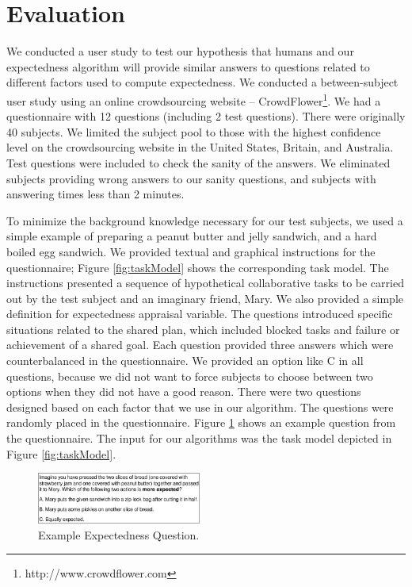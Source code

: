 \documentclass{aamas2016_extendedabstract}
\begin{document}
\vspace*{-3mm}
\section{Evaluation}

We conducted a user study to test our hypothesis that humans and our
expectedness algorithm will provide similar answers to questions related to
different factors used to compute expectedness. We conducted a between-subject
user study using an online crowdsourcing website --
CrowdFlower\footnote{http://www.crowdflower.com}. We had a questionnaire with 12
questions (including 2 test questions). There were originally 40 subjects. We
limited the subject pool to those with the highest confidence level on the
crowdsourcing website in the United States, Britain, and Australia. Test
questions were included to check the sanity of the answers. We eliminated
subjects providing wrong answers to our sanity questions, and subjects with
answering times less than 2 minutes.

To minimize the background knowledge necessary for our test subjects, we used a
simple example of preparing a peanut butter and jelly sandwich, and a hard
boiled egg sandwich. We provided textual and graphical instructions for the
questionnaire; Figure \ref{fig:taskModel} shows the corresponding task
model. The instructions presented a sequence of hypothetical collaborative tasks
to be carried out by the test subject and an imaginary friend, Mary. We also
provided a simple definition for expectedness appraisal variable. The questions
introduced specific situations related to the shared plan, which included
blocked tasks and failure or achievement of a shared goal. Each question
provided three answers which were counterbalanced in the questionnaire. We
provided an option like C in all questions, because we did not want to force
subjects to choose between two options when they did not have a good reason.
There were two questions designed based on each factor that we use in our
algorithm. The questions were randomly placed in the questionnaire. Figure
\ref{fig:qs1} shows an example question from the questionnaire. The input for
our algorithms was the task model depicted in Figure \ref{fig:taskModel}.

\begin{figure}[tbh]
  \vspace{-1mm}
  \centering
  \includegraphics[width=0.48\textwidth]{figure/question-sample-croped.pdf}
  \vspace*{-7mm}
  \caption{{\fontsize{9}{9}\selectfont Example Expectedness Question.}}
  \label{fig:qs1}
  \vspace{-3mm}
\end{figure}
\end{document}
